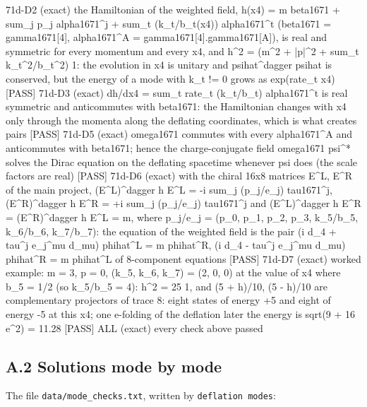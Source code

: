\documentclass[
  10pt,
]{article}
\newenvironment{Shaded}{}{}
\newcommand{\NormalTok}[1]{#1}
\begin{document}
\begin{Shaded}
\begin{Highlighting}[]
\NormalTok{[PASS] 71d{-}D2  (exact) the Hamiltonian of the weighted field, h(x4) = m beta1671 + sum\_j p\_j alpha1671\^{}j + sum\_t (k\_t/b\_t(x4)) alpha1671\^{}t (beta1671 = gamma1671[4], alpha1671\^{}A = gamma1671[4].gamma1671[A]), is real and symmetric for every momentum and every x4, and h\^{}2 = (m\^{}2 + |p|\^{}2 + sum\_t k\_t\^{}2/b\_t\^{}2) 1: the evolution in x4 is unitary and psihat\^{}dagger psihat is conserved, but the energy of a mode with k\_t != 0 grows as exp(rate\_t x4)}
\NormalTok{[PASS] 71d{-}D3  (exact) dh/dx4 = sum\_t rate\_t (k\_t/b\_t) alpha1671\^{}t is real symmetric and anticommutes with beta1671: the Hamiltonian changes with x4 only through the momenta along the deflating coordinates, which is what creates pairs}
\NormalTok{[PASS] 71d{-}D5  (exact) omega1671 commutes with every alpha1671\^{}A and anticommutes with beta1671; hence the charge{-}conjugate field omega1671 psi\^{}* solves the Dirac equation on the deflating spacetime whenever psi does (the scale factors are real)}
\NormalTok{[PASS] 71d{-}D6  (exact) with the chiral 16x8 matrices E\^{}L, E\^{}R of the main project, (E\^{}L)\^{}dagger h E\^{}L = {-}i sum\_j (p\_j/e\_j) tau1671\^{}j, (E\^{}R)\^{}dagger h E\^{}R = +i sum\_j (p\_j/e\_j) tau1671\^{}j and (E\^{}L)\^{}dagger h E\^{}R = (E\^{}R)\^{}dagger h E\^{}L = m, where p\_j/e\_j = (p\_0, p\_1, p\_2, p\_3, k\_5/b\_5, k\_6/b\_6, k\_7/b\_7): the equation of the weighted field is the pair (i d\_4 + tau\^{}j e\_j\^{}mu d\_mu) phihat\^{}L = m phihat\^{}R, (i d\_4 {-} tau\^{}j e\_j\^{}mu d\_mu) phihat\^{}R = m phihat\^{}L of 8{-}component equations}
\NormalTok{[PASS] 71d{-}D7  (exact) worked example: m = 3, p = 0, (k\_5, k\_6, k\_7) = (2, 0, 0) at the value of x4 where b\_5 = 1/2 (so k\_5/b\_5 = 4): h\^{}2 = 25 1, and (5 + h)/10, (5 {-} h)/10 are complementary projectors of trace 8: eight states of energy +5 and eight of energy {-}5 at this x4; one e{-}folding of the deflation later the energy is sqrt(9 + 16 e\^{}2) = 11.28}
\NormalTok{[PASS] ALL  (exact) every check above passed}
\end{Highlighting}
\end{Shaded}

\hypertarget{a.2-solutions-mode-by-mode}{%
\subsection{A.2 Solutions mode by
mode}\label{a.2-solutions-mode-by-mode}}

The file \texttt{data/mode\_checks.txt}, written by
\texttt{deflation\ modes}:
\end{document}
